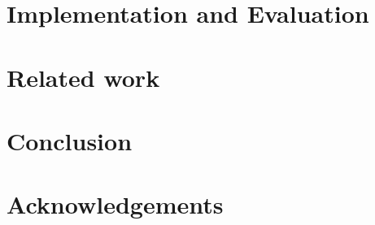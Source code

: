 \documentclass[10pt, conference, letterpaper]{IEEEtran}
\begin{document}
\section{Implementation and Evaluation}
\label{sec:eva}


\section{Related work}
\label{sec:review}


\section{Conclusion}
\label{sec:conclusion}



\section{Acknowledgements}
\label{sec:ack}

{\small


}
\end{document}
